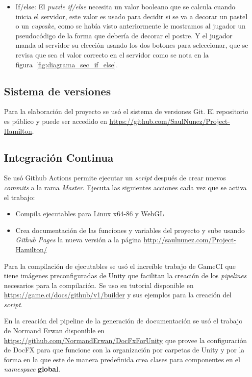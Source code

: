 \begin{itemize}
    \item If/else: El \textit{puzzle if/else} necesita un valor booleano que se calcula cuando inicia el servidor, este valor es usado para decidir si se va a decorar un pastel o un \textit{cupcake}, como se había visto anteriormente le mostramos al jugador un pseudocódigo de la forma que debería de decorar el postre. Y el jugador manda al servidor su elección usando los dos botones para seleccionar, que se revisa que sea el valor correcto en el servidor como se nota en la figura~\ref{fig:diagrama_sec_if_else}.
\end{itemize}


\subsection{Sistema de versiones}
Para la elaboración del proyecto se usó el sistema de versiones Git. El repositorio es público y puede ser accedido en \url{https://github.com/SaulNunez/Project-Hamilton}.

\subsection{Integración Continua}
Se usó Github Actions permite ejecutar un \textit{script} después de crear nuevos \textit{commits} a la rama \textit{Master}.
Ejecuta las siguientes acciones cada vez que se activa el trabajo:
\begin{itemize}
    \item Compila ejecutables para Linux x64-86 y WebGL
    \item Crea documentación de las funciones y variables del proyecto y sube usando \textit{Github Pages} la nueva versión a la página \url{http://saulnunez.com/Project-Hamilton/}
\end{itemize}

Para la compilación de ejecutables se usó el increíble trabajo de GameCI que tiene imágenes preconfiguradas de Unity que facilitan la creación de los \textit{pipelines} necesarios para la compilación. Se uso su tutorial disponible en \url{https://game.ci/docs/github/v1/builder} y sus ejemplos para la creación del \textit{script}.

En la creación del pipeline de la generación de documentación se usó el trabajo de Normand Erwan disponible en \url{https://github.com/NormandErwan/DocFxForUnity} que provee la configuración de DocFX para que funcione con la organización por carpetas de Unity y por la forma en la que este de manera predefinida crea clases para componentes en el \textit{namespace} \textbf{global}.

